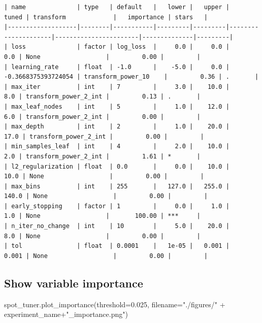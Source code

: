 \documentclass[
  letterpaper,
  DIV=11,
  numbers=noendperiod]{scrreprt}
\newenvironment{Shaded}{\begin{snugshade}}{\end{snugshade}}
\newcommand{\FloatTok}[1]{\textcolor[rgb]{0.68,0.00,0.00}{#1}}
\newcommand{\NormalTok}[1]{\textcolor[rgb]{0.00,0.23,0.31}{#1}}
\newcommand{\OperatorTok}[1]{\textcolor[rgb]{0.37,0.37,0.37}{#1}}
\newcommand{\StringTok}[1]{\textcolor[rgb]{0.13,0.47,0.30}{#1}}
\begin{document}
\begin{verbatim}
| name              | type   | default   |   lower |   upper |               tuned | transform             |   importance | stars   |
|-------------------|--------|-----------|---------|---------|---------------------|-----------------------|--------------|---------|
| loss              | factor | log_loss  |     0.0 |     0.0 |                 0.0 | None                  |         0.00 |         |
| learning_rate     | float  | -1.0      |    -5.0 |     0.0 | -0.3668375393724054 | transform_power_10    |         0.36 | .       |
| max_iter          | int    | 7         |     3.0 |    10.0 |                 8.0 | transform_power_2_int |         0.13 | .       |
| max_leaf_nodes    | int    | 5         |     1.0 |    12.0 |                 6.0 | transform_power_2_int |         0.00 |         |
| max_depth         | int    | 2         |     1.0 |    20.0 |                17.0 | transform_power_2_int |         0.00 |         |
| min_samples_leaf  | int    | 4         |     2.0 |    10.0 |                 2.0 | transform_power_2_int |         1.61 | *       |
| l2_regularization | float  | 0.0       |     0.0 |    10.0 |                10.0 | None                  |         0.00 |         |
| max_bins          | int    | 255       |   127.0 |   255.0 |               140.0 | None                  |         0.00 |         |
| early_stopping    | factor | 1         |     0.0 |     1.0 |                 1.0 | None                  |       100.00 | ***     |
| n_iter_no_change  | int    | 10        |     5.0 |    20.0 |                 8.0 | None                  |         0.00 |         |
| tol               | float  | 0.0001    |   1e-05 |   0.001 |               0.001 | None                  |         0.00 |         |
\end{verbatim}

\hypertarget{show-variable-importance-2}{%
\subsection{Show variable importance}\label{show-variable-importance-2}}

\begin{Shaded}
\begin{Highlighting}[]
\NormalTok{spot\_tuner.plot\_importance(threshold}\OperatorTok{=}\FloatTok{0.025}\NormalTok{, filename}\OperatorTok{=}\StringTok{"./figures/"} \OperatorTok{+}\NormalTok{ experiment\_name}\OperatorTok{+}\StringTok{"\_importance.png"}\NormalTok{)}
\end{Highlighting}
\end{Shaded}
\end{document}

